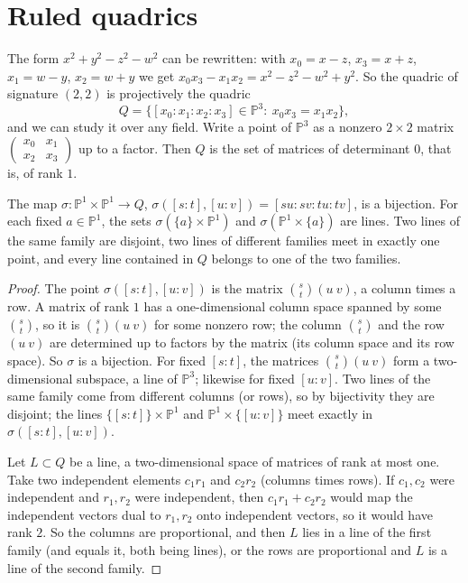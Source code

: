 \section{Ruled quadrics}\label{geometry:sec:ruled}

The form $x^2+y^2-z^2-w^2$ can be rewritten: with $x_0=x-z$, $x_3=x+z$, $x_1=w-y$, $x_2=w+y$ we get $x_0x_3-x_1x_2=x^2-z^2-w^2+y^2$. So the quadric of
signature $(2,2)$ is projectively the quadric
\[
Q=\{[x_0:x_1:x_2:x_3]\in\mathbb P^3:\ x_0x_3=x_1x_2\},
\]
and we can study it over any field. Write a point of $\mathbb P^3$ as a nonzero $2\times2$ matrix $\begin{pmatrix}x_0&x_1\\x_2&x_3\end{pmatrix}$ up to a
factor. Then $Q$ is the set of matrices of determinant $0$, that is, of rank $1$.

\begin{theorem}\label{geometry:thm:segre}
The map $\sigma:\mathbb P^1\times\mathbb P^1\to Q$, $\sigma([s:t],[u:v])=[su:sv:tu:tv]$, is a bijection. For each fixed $a\in\mathbb P^1$, the sets
$\sigma(\{a\}\times\mathbb P^1)$ and $\sigma(\mathbb P^1\times\{a\})$ are lines. Two lines of the same family are disjoint, two lines of different families
meet in exactly one point, and every line contained in $Q$ belongs to one of the two families.
\end{theorem}

\begin{proof}
The point $\sigma([s:t],[u:v])$ is the matrix $\binom st(u\ v)$, a column times a row. A matrix of rank $1$ has a one-dimensional column space spanned
by some $\binom st$, so it is $\binom st(u\ v)$ for some nonzero row; the column $\binom st$ and the row $(u\ v)$ are determined up to factors by
the matrix (its column space and its row space). So $\sigma$ is a bijection. For fixed $[s:t]$, the matrices $\binom st(u\ v)$ form a two-dimensional
subspace, a line of $\mathbb P^3$; likewise for fixed $[u:v]$. Two lines of the same family come from different columns (or rows), so by bijectivity
they are disjoint; the lines $\{[s:t]\}\times\mathbb P^1$ and $\mathbb P^1\times\{[u:v]\}$ meet exactly in $\sigma([s:t],[u:v])$.

Let $L\subset Q$ be a line, a two-dimensional space of matrices of rank at most one. Take two independent elements $c_1r_1$ and $c_2r_2$ (columns
times rows). If $c_1,c_2$ were independent and $r_1,r_2$ were independent, then $c_1r_1+c_2r_2$ would map the independent vectors dual to $r_1,r_2$
onto independent vectors, so it would have rank $2$. So the columns are proportional, and then $L$ lies in a line of the first family (and equals it,
both being lines), or the rows are proportional and $L$ is a line of the second family.
\end{proof}


